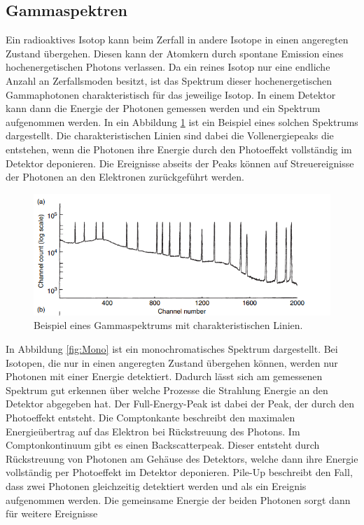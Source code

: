 \subsection{Gammaspektren}
Ein radioaktives Isotop kann beim Zerfall in andere Isotope in einen angeregten Zustand übergehen. Diesen kann der Atomkern durch spontane Emission eines 
hochenergetischen Photons verlassen. Da ein reines Isotop nur eine endliche Anzahl an Zerfallsmoden besitzt, ist das Spektrum dieser hochenergetischen 
Gammaphotonen charakteristisch für das jeweilige Isotop. In einem Detektor kann dann die Energie der Photonen gemessen werden und ein Spektrum aufgenommen werden.
In ein Abbildung \ref{fig:Spektrum} ist ein Beispiel eines solchen Spektrums dargestellt. Die charakteristischen Linien sind dabei die Vollenergiepeaks die 
entstehen, wenn die Photonen ihre Energie durch den Photoeffekt vollständig im Detektor deponieren. Die Ereignisse abseits der Peaks können 
auf Streuereignisse der Photonen an den Elektronen zurückgeführt werden.
\begin{figure}[H]
    \centering
    \includegraphics[scale=1.0]{illustration/LinienSpektrum.png}
    \caption{Beispiel eines Gammaspektrums mit charakteristischen Linien.\cite{GammaRay}}
    \label{fig:Spektrum}
\end{figure}
In Abbildung \ref{fig:Mono} ist ein monochromatisches Spektrum dargestellt. Bei Isotopen, die nur in einen angeregten Zustand übergehen können,
werden nur Photonen mit einer Energie detektiert. Dadurch lässt sich am gemessenen Spektrum gut erkennen über welche Prozesse die Strahlung Energie
an den Detektor abgegeben hat. Der Full-Energy-Peak ist dabei der Peak, der durch den Photoeffekt entsteht. Die Comptonkante beschreibt 
den maximalen Energieübertrag auf das Elektron bei Rückstreuung des Photons. Im Comptonkontinuum gibt es einen Backscatterpeak. Dieser entsteht 
durch Rückstreuung von Photonen am Gehäuse des Detektors, welche dann ihre Energie vollständig per Photoeffekt im Detektor deponieren.
Pile-Up beschreibt den Fall, dass zwei Photonen gleichzeitig detektiert werden und als ein Ereignis aufgenommen werden. Die gemeinsame Energie der beiden Photonen sorgt dann für weitere Ereignisse 
